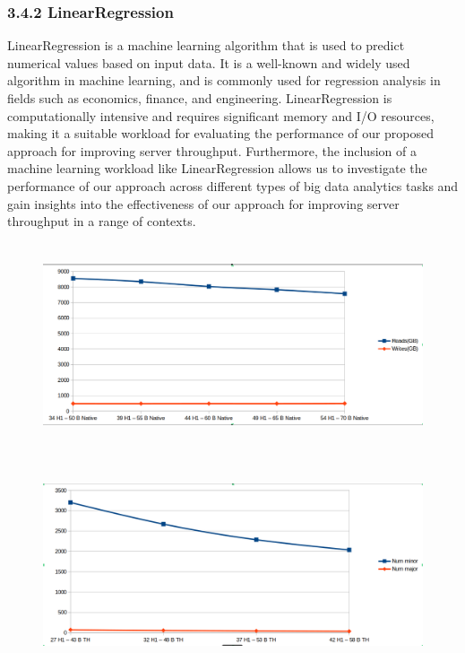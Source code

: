 \documentclass[twocolumn,10pt]{asme2e}
\begin{document}
\subsubsection*{3.4.2 LinearRegression}
LinearRegression is a machine learning algorithm that is used to predict numerical values based on input data. It is a well-known and widely used algorithm in machine learning, and is commonly used for regression analysis in fields such as economics, finance, and engineering. LinearRegression is computationally intensive and requires significant memory and I/O resources, making it a suitable workload for evaluating the performance of our proposed approach for improving server throughput. Furthermore, the inclusion of a machine learning workload like LinearRegression allows us to investigate the performance of our approach across different types of big data analytics tasks and gain insights into the effectiveness of our approach for improving server throughput in a range of contexts.

\begin{figure}[h!]
        \includegraphics[width=12cm,height=6cm]{gcs_linr_h1_native.png}
\end{figure}

\begin{figure}[h!]
        \includegraphics[width=12cm,height=6cm]{gcs_linr_h1_th.png}
\end{figure}
\end{document}
